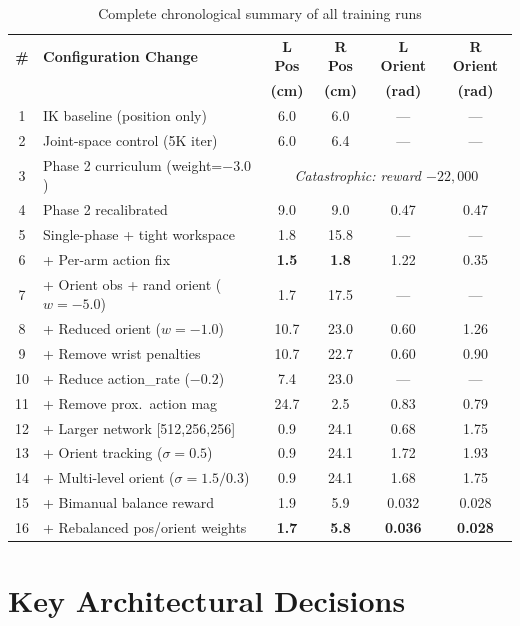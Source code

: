\documentclass[11pt,a4paper]{article}
\begin{document}
\begin{table}[H]
\centering
\small
\caption{Complete chronological summary of all training runs}
\label{tab:all_runs}
\begin{tabular}{@{}clcccc@{}}
\toprule
\textbf{\#} & \textbf{Configuration Change} & \textbf{L Pos} & \textbf{R Pos} & \textbf{L Orient} & \textbf{R Orient} \\
& & \textbf{(cm)} & \textbf{(cm)} & \textbf{(rad)} & \textbf{(rad)} \\
\midrule
1 & IK baseline (position only) & 6.0 & 6.0 & --- & --- \\
2 & Joint-space control (5K iter) & 6.0 & 6.4 & --- & --- \\
3 & Phase 2 curriculum (weight=$-3.0$) & \multicolumn{4}{c}{\textit{Catastrophic: reward $-22,000$}} \\
4 & Phase 2 recalibrated & 9.0 & 9.0 & 0.47 & 0.47 \\
5 & Single-phase + tight workspace & 1.8 & 15.8 & --- & --- \\
6 & + Per-arm action fix & \textbf{1.5} & \textbf{1.8} & 1.22 & 0.35 \\
7 & + Orient obs + rand orient ($w=-5.0$) & 1.7 & 17.5 & --- & --- \\
8 & + Reduced orient ($w=-1.0$) & 10.7 & 23.0 & 0.60 & 1.26 \\
9 & + Remove wrist penalties & 10.7 & 22.7 & 0.60 & 0.90 \\
10 & + Reduce action\_rate ($-0.2$) & 7.4 & 23.0 & --- & --- \\
11 & + Remove prox.\ action mag & 24.7 & 2.5 & 0.83 & 0.79 \\
12 & + Larger network [512,256,256] & 0.9 & 24.1 & 0.68 & 1.75 \\
13 & + Orient tracking ($\sigma=0.5$) & 0.9 & 24.1 & 1.72 & 1.93 \\
14 & + Multi-level orient ($\sigma=1.5/0.3$) & 0.9 & 24.1 & 1.68 & 1.75 \\
15 & + Bimanual balance reward & 1.9 & 5.9 & 0.032 & 0.028 \\
16 & + Rebalanced pos/orient weights & \textbf{1.7} & \textbf{5.8} & \textbf{0.036} & \textbf{0.028} \\
\bottomrule
\end{tabular}
\end{table}

\section{Key Architectural Decisions}
\end{document}

